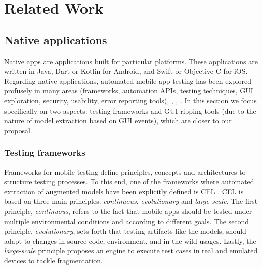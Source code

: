 %
\chapter{Related Work}
\label{chapter2}


\section{Native applications}
Native apps are applications built for particular platforms. These applications are written in Java, Dart or Kotlin for Android, and Swift or Objective-C for iOS. Regarding native applications, automated mobile app testing has been explored profusely in many areas (\eg frameworks, automation APIs, testing techniques, GUI exploration, security, usability, error reporting tools)\cite{linares-vasquez_moran_poshyvanyk_2017}, \cite{zein_salleh_grundy_2016}, \cite{Choudhary:ASE15}, \cite{Kochhar:ICST15}. In this section we focus specifically on two aspects: testing frameworks and GUI ripping tools (due to the nature of model extraction based on GUI events), which are closer to our proposal.
\subsection{Testing frameworks}

Frameworks for mobile testing define principles, concepts and architectures to structure testing processes. To this end,  one of the frameworks where automated extraction of augmented models have been explicitly defined is CEL \cite{linares-vasquez_moran_poshyvanyk_2017}. CEL is based on three main principles: \emph{continuous}, \emph{evolutionary} and \emph{large-scale}. The first principle, \emph{continuous}, refers to the fact that mobile apps should be tested under multiple environmental conditions and according to different goals. The second principle, \emph{evolutionary}, sets forth that testing artifacts like the models, should adapt to changes in source code, environment, and in-the-wild usages. Lastly, the \emph{large-scale} principle proposes an engine to execute test cases in real and emulated devices to tackle fragmentation.

